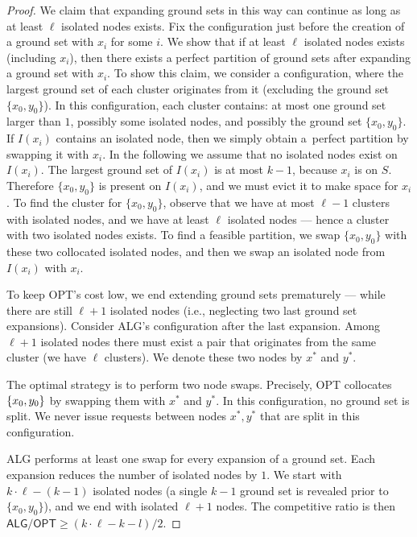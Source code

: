 \documentclass[manuscript,screen=true, review, anonymous]{acmart}
\newcommand{\OPT}{\textsf{OPT}\xspace}
\newcommand{\ALG}{\textsf{ALG}\xspace}
\DeclarePairedDelimiter\set{\{}{\}}
\begin{document}
\begin{proof}
	We claim that expanding ground sets in this way can continue as long as at least $\ell$ isolated nodes exists.
	Fix the configuration just before the creation of a ground set with $x_i$ for some $i$.
	We show that if at least $\ell$ isolated nodes exists (including $x_i$), then there exists a perfect partition of ground sets after expanding a ground set with $x_i$.
	To show this claim, we consider a configuration, where the largest ground set of each cluster originates from it (excluding the ground set $\{x_0, y_0\}$).
	In this configuration, each cluster contains:  at most one ground set larger than $1$, possibly some isolated nodes, and possibly the ground set $\{x_0, y_0\}$.
	If $I(x_i)$ contains an isolated node, then we simply obtain a~perfect partition by swapping it with $x_i$.
	In the following we assume that no isolated nodes exist on $I(x_i)$.
	The largest ground set of $I(x_i)$ is at most $k-1$, because $x_i$ is on $S$.
	Therefore $\{x_0, y_0\}$ is present on $I(x_i)$, and we must evict it to make space for $x_i$.
	To find the cluster for $\{x_0, y_0\}$, observe that we have at most $\ell-1$ clusters with isolated nodes, and we have at least $\ell$ isolated nodes --- hence a cluster with two isolated nodes exists.
	To find a feasible partition, we swap $\{x_0, y_0\}$ with these two collocated isolated nodes, and then we swap an isolated node from $I(x_i)$ with $x_i$.
	

	To keep \OPT's cost low, we end extending ground sets prematurely --- while there are still $\ell+1$ isolated nodes (i.e., neglecting two last ground set expansions).
	Consider \ALG's configuration after the last expansion.
	Among $\ell+1$ isolated nodes there must exist a pair that originates from the same cluster (we have $\ell$ clusters). 
	We denote these two nodes by $x^*$ and $y^*$.

	The optimal strategy is to perform two node swaps.
	Precisely, \OPT collocates $\set{x_0,y_0}$ by swapping them with $x^*$ and $y^*$.
	In this configuration, no ground set is split.
	We never issue requests between nodes $x^*, y^*$ that are split in this configuration.


	\ALG performs at least one swap for every expansion of a ground set.
	Each expansion reduces the number of isolated nodes by $1$.
	We start with $k \cdot \ell - (k-1)$ isolated nodes (a single $k-1$ ground set is revealed prior to $\{x_0, y_0\}$), and we end with isolated $\ell+1$ nodes.
	The competitive ratio is then $\ALG / \OPT \geq (k\cdot \ell - k - l) / 2$.
\end{proof}
\end{document}
